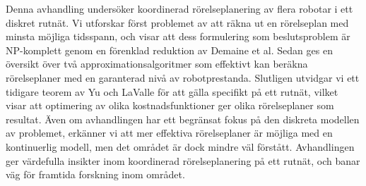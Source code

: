 \documentclass[main=english, 12pt, a4paper, sci, utf8, a-1b, online]{aaltothesis}
\date{\today}
\begin{document}
\makecoverpage

\makecopyrightpage


\begin{abstractpage}[english]
    \abstracttext{}
\end{abstractpage}

\newpage

\begin{abstractpage}[swedish]
Denna avhandling undersöker koordinerad rörelseplanering av flera robotar i ett diskret rutnät.
Vi utforskar först problemet av att räkna ut en rörelseplan med minsta möjliga tidsspann, och visar att dess formulering som beslutsproblem är NP-komplett genom en förenklad reduktion av Demaine et al.
Sedan ges en översikt över två approximationsalgoritmer som effektivt kan beräkna rörelseplaner med en garanterad nivå av robotprestanda.
Slutligen utvidgar vi ett tidigare teorem av Yu och LaValle för att gälla specifikt på ett rutnät, vilket visar att optimering av olika kostnadsfunktioner ger olika rörelseplaner som resultat.
Även om avhandlingen har ett begränsat fokus på den diskreta modellen av problemet, erkänner vi att mer effektiva rörelseplaner är möjliga med en kontinuerlig modell, men det området är dock mindre väl förstått.
Avhandlingen ger värdefulla insikter inom koordinerad rörelseplanering på ett rutnät, och banar väg för framtida forskning inom området.
\end{abstractpage}





\newpage


\thesistableofcontents
\cleardoublepage
\end{document}
